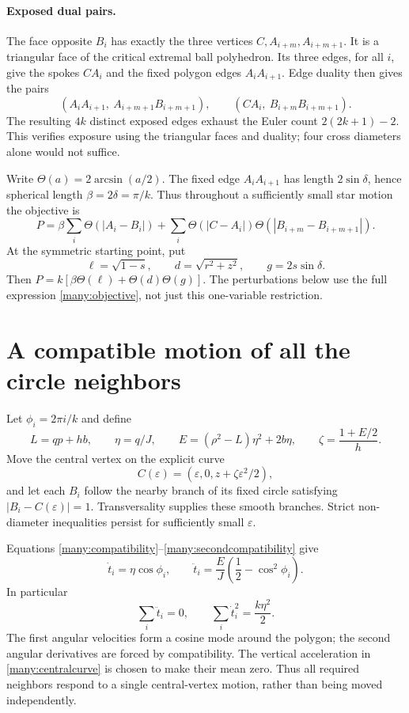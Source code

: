 \documentclass[11pt]{article}
\theoremstyle{remark}\newtheorem{remark}[theorem]{Remark}
\newcommand{\Th}{\Theta}
\begin{document}
\paragraph{Exposed dual pairs.}
The face opposite $B_i$ has exactly the three vertices
$C,A_{i+m},A_{i+m+1}$. It is a triangular face of the critical
extremal ball polyhedron. Its three edges, for all $i$, give the
spokes $CA_i$ and the fixed polygon edges $A_iA_{i+1}$.
Edge duality then gives the pairs
\begin{equation}\label{many:dualpairs}
 (A_iA_{i+1},\ A_{i+m+1}B_{i+m+1}),\qquad
 (CA_i,\ B_{i+m}B_{i+m+1}).
\end{equation}
The resulting $4k$ distinct exposed edges exhaust the Euler count
$2(2k+1)-2$. This verifies exposure using the triangular faces and
duality; four cross diameters alone would not suffice.

Write $\Th(a)=2\arcsin(a/2)$. The fixed edge $A_iA_{i+1}$ has
length $2\sin\delta$, hence spherical length $\beta=2\delta=\pi/k$.
Thus throughout a sufficiently small star motion the objective is
\begin{equation}\label{many:objective}
 P=\beta\sum_i\Th(|A_i-B_i|)
   +\sum_i\Th(|C-A_i|)\Th(|B_{i+m}-B_{i+m+1}|).
\end{equation}
At the symmetric starting point, put
\[
 \ell=\sqrt{1-s},\qquad d=\sqrt{r^2+z^2},\qquad
 g=2s\sin\delta.
\]
Then $P=k[\beta\Th(\ell)+\Th(d)\Th(g)]$.
The perturbations below use the full expression \eqref{many:objective},
not just this one-variable restriction.

\section{A compatible motion of all the circle neighbors}
Let $\phi_i=2\pi i/k$ and define
\[
 L=qp+hb,\qquad \eta=q/J,\qquad
 E=(\rho^2-L)\eta^2+2b\eta,\qquad
 \zeta=\frac{1+E/2}{h}.
\]
Move the central vertex on the explicit curve
\begin{equation}\label{many:centralcurve}
 C(\varepsilon)=(\varepsilon,0,z+\zeta\varepsilon^2/2),
\end{equation}
and let each $B_i$ follow the nearby branch of its fixed circle
satisfying $|B_i-C(\varepsilon)|=1$.
Transversality supplies these smooth branches. Strict non-diameter
inequalities persist for sufficiently small $\varepsilon$.

Equations \eqref{many:compatibility}--\eqref{many:secondcompatibility} give
\begin{equation}\label{many:angularjets}
 \dot t_i=\eta\cos\phi_i,\qquad
 \ddot t_i=\frac{E}{J}\left(\frac12-\cos^2\phi_i\right).
\end{equation}
In particular
\[
 \sum_i\ddot t_i=0,\qquad
 \sum_i\dot t_i^2=\frac{k\eta^2}{2}.
\]
The first angular velocities form a cosine mode around the polygon;
the second angular derivatives are forced by compatibility. The
vertical acceleration in \eqref{many:centralcurve} is chosen to make
their mean zero. Thus all required neighbors respond to a single
central-vertex motion, rather than being moved independently.
\end{document}
